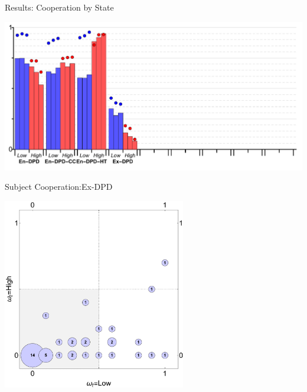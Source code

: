 \documentclass{beamer}
\begin{document}
\begin{frame}{Results: Cooperation by State}
\begin{card}
\begin{center}
	\includegraphics[width=1.0\textwidth]{./i/col_bar_StateCoop_block_ExDPD.pdf}
\end{center}
\end{card}
\end{frame}

\begin{frame}{Subject Cooperation:Ex-DPD }

\begin{card}
\begin{center}
	\includegraphics[width=0.6\textwidth]{./i/col_subject_stateCooperation_L5_ExDPD.pdf}
\end{center}
\end{card}
\end{frame}
\end{document}
